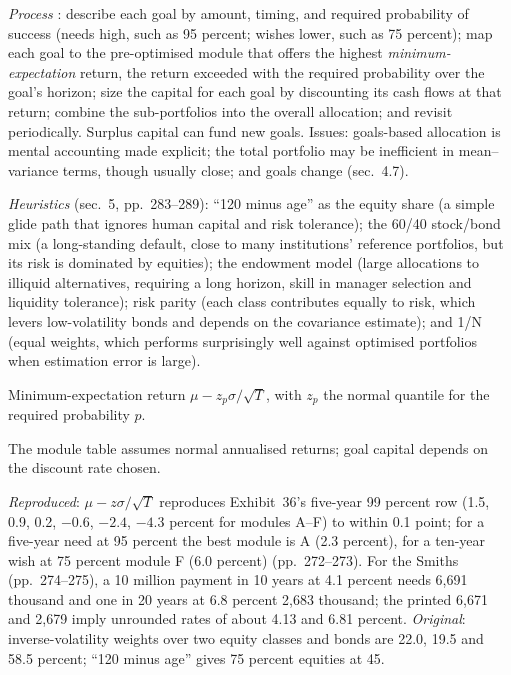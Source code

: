 \begin{qfmethod}\label{meth:goals-based-allocation-heuristics}
 \emph{Process} \citep[chap.~6, sec.~4, pp.~268--283]{portfolio-management-in-practice-v1-2020}: describe each goal by amount, timing, and required probability of success (needs high, such as 95 percent; wishes lower, such as 75 percent); map each goal to the pre-optimised module that offers the highest \emph{minimum-expectation} return, the return exceeded with the required probability over the goal's horizon; size the capital for each goal by discounting its cash flows at that return; combine the sub-portfolios into the overall allocation; and revisit periodically. Surplus capital can fund new goals. Issues: goals-based allocation is mental accounting made explicit; the total portfolio may be inefficient in mean--variance terms, though usually close; and goals change (sec.~4.7).

\emph{Heuristics} (sec.~5, pp.~283--289): ``120 minus age'' as the equity share (a simple glide path that ignores human capital and risk tolerance); the 60/40 stock/bond mix (a long-standing default, close to many institutions' reference portfolios, but its risk is dominated by equities); the endowment model (large allocations to illiquid alternatives, requiring a long horizon, skill in manager selection and liquidity tolerance); risk parity (each class contributes equally to risk, which levers low-volatility bonds and depends on the covariance estimate); and 1/N (equal weights, which performs surprisingly well against optimised portfolios when estimation error is large).

 Minimum-expectation return $\mu-z_p\sigma/\sqrt{T}$, with $z_p$ the normal quantile for the required probability $p$.

 The module table assumes normal annualised returns; goal capital depends on the discount rate chosen.

 \emph{Reproduced}: $\mu-z\sigma/\sqrt T$ reproduces Exhibit~36's five-year 99 percent row (1.5, 0.9, 0.2, $-0.6$, $-2.4$, $-4.3$ percent for modules A--F) to within 0.1 point; for a five-year need at 95 percent the best module is A (2.3 percent), for a ten-year wish at 75 percent module F (6.0 percent) (pp.~272--273). For the Smiths (pp.~274--275), a 10 million payment in 10 years at 4.1 percent needs 6{,}691 thousand and one in 20 years at 6.8 percent 2{,}683 thousand; the printed 6{,}671 and 2{,}679 imply unrounded rates of about 4.13 and 6.81 percent. \emph{Original}: inverse-volatility weights over two equity classes and bonds are 22.0, 19.5 and 58.5 percent; ``120 minus age'' gives 75 percent equities at 45.


\end{qfmethod}
